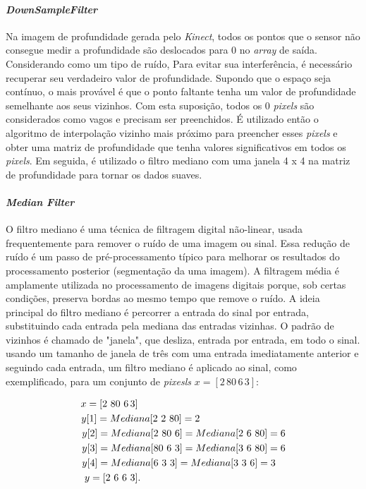 \paragraph{\textit{DownSampleFilter}}\label{sec:DSfilter}
 Na imagem de profundidade gerada pelo \textit{Kinect}, todos os pontos que o sensor não consegue medir a profundidade são deslocados para 0 no \textit{array} de saída. Considerando  como um tipo de ruído, Para evitar sua interferência, é necessário recuperar seu verdadeiro valor de profundidade. Supondo que o espaço seja contínuo, o mais provável é que o ponto faltante tenha um valor de profundidade semelhante aos seus vizinhos. Com esta suposição, todos os 0 \textit{pixels} são considerados como vagos e precisam ser preenchidos. É utilizado então o algoritmo de interpolação vizinho mais próximo para preencher esses \textit{pixels} e obter uma matriz de profundidade que tenha valores significativos em todos os \textit{pixels}. Em seguida, é utilizado o filtro mediano com uma janela 4 x 4 na matriz de profundidade para tornar os dados suaves.

\paragraph{\textit{Median Filter}}\label{sec:Mfilter}
O filtro mediano é uma técnica de filtragem digital não-linear, usada frequentemente para remover o ruído de uma imagem ou sinal. Essa redução de ruído é um passo de pré-processamento típico para melhorar os resultados do processamento posterior (segmentação da uma imagem). A filtragem média é amplamente utilizada no processamento de imagens digitais porque, sob certas condições, preserva bordas ao mesmo tempo que remove o ruído. A ideia principal do filtro mediano é percorrer a entrada do sinal por entrada, substituindo cada entrada pela mediana das entradas vizinhas. O padrão de vizinhos é chamado de "janela", que desliza, entrada por entrada, em todo o sinal. usando um tamanho de janela de três com uma entrada imediatamente anterior e seguindo cada entrada, um filtro mediano é aplicado ao  sinal, como exemplificado, para um conjunto de \textit{pixesls} $x = [2\,80\, 6 \,3]$:

\begin{align*}
x = [2\,\, 80\,\, 6 \,3]\MoveEqLeft[23]\\
y[1] = Mediana[2\,\, 2\,\, 80] = 2\MoveEqLeft[16.7]\\
y[2] = Mediana[2\,\, 80\,\, 6] = Mediana[2\,\, 6\,\, 80] = 6\MoveEqLeft[8]\\
y[3] = Mediana[80\,\, 6\,\, 3] = Mediana[3\,\, 6\,\, 80] = 6\MoveEqLeft[8]\\
y[4] = Mediana[6\,\, 3\,\, 3] = Mediana[3\,\, 3\,\, 6] = 3\MoveEqLeft[9]\\
y = [2\,\, 6\,\, 6\,\, 3]\MoveEqLeft[23].
\end{align*}

